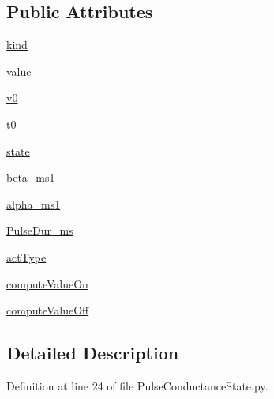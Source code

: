 \subsection*{Public Attributes}
\begin{DoxyCompactItemize}
\item 
\hyperlink{class_pulse_conductance_state_1_1_pulse_conductance_state_a53d237daaa4815ad375e2377da89845e}{kind}
\item 
\hyperlink{class_pulse_conductance_state_1_1_pulse_conductance_state_a832cdff7f315b8c16bef00642fb385dd}{value}
\item 
\hyperlink{class_pulse_conductance_state_1_1_pulse_conductance_state_a215539a3eb60e280225053c83f386d79}{v0}
\item 
\hyperlink{class_pulse_conductance_state_1_1_pulse_conductance_state_a55f44caf230fc3899811924118705f56}{t0}
\item 
\hyperlink{class_pulse_conductance_state_1_1_pulse_conductance_state_ac85aa714a187088e1b31fa2369ed4bca}{state}
\item 
\hyperlink{class_pulse_conductance_state_1_1_pulse_conductance_state_a8ebc0c29d97fa09699d7dfb724e94f82}{beta\-\_\-ms1}
\item 
\hyperlink{class_pulse_conductance_state_1_1_pulse_conductance_state_a5fe4e2c9035df43a1e8eb9d66d669e14}{alpha\-\_\-ms1}
\item 
\hyperlink{class_pulse_conductance_state_1_1_pulse_conductance_state_afda03b180fc3cb619de615632e725a6f}{Pulse\-Dur\-\_\-ms}
\item 
\hyperlink{class_pulse_conductance_state_1_1_pulse_conductance_state_a0677d7b972a6f6a12abc666212a12297}{act\-Type}
\item 
\hyperlink{class_pulse_conductance_state_1_1_pulse_conductance_state_a7f6710b9f97ac5879888402cd5ed15d4}{compute\-Value\-On}
\item 
\hyperlink{class_pulse_conductance_state_1_1_pulse_conductance_state_a89e0cc154bd699aee7529574a8fe556c}{compute\-Value\-Off}
\end{DoxyCompactItemize}


\subsection{Detailed Description}


Definition at line 24 of file Pulse\-Conductance\-State.\-py.



